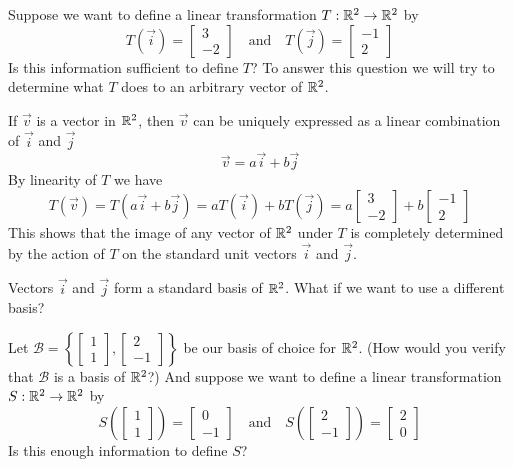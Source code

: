 \documentclass{ximera}
\begin{document}
\begin{exploration}\label{init:tij}  Suppose we want to define a linear transformation $T:\mathbb{R}^2\rightarrow \mathbb{R}^2$ by $$T(\vec{i})=\begin{bmatrix}3\\-2\end{bmatrix}\quad\text{and}\quad T(\vec{j})=\begin{bmatrix}-1\\2\end{bmatrix}$$  
Is this information sufficient to define $T$?  
To answer this question we will try to determine what $T$ does to an arbitrary vector of $\mathbb{R}^2$.  

If $\vec{v}$ is a vector in $\mathbb{R}^2$, then $\vec{v}$ can be uniquely expressed as a linear combination of $\vec{i}$ and $\vec{j}$
$$\vec{v}=a\vec{i}+b\vec{j}$$  By linearity of $T$ we have $$T(\vec{v})=T(a\vec{i}+b\vec{j})=aT(\vec{i})+bT(\vec{j})=a\begin{bmatrix}3\\-2\end{bmatrix}+b\begin{bmatrix}-1\\2\end{bmatrix}$$
This shows that the image of any vector of $\mathbb{R}^2$ under $T$ is completely determined by the action of $T$ on the standard unit vectors $\vec{i}$ and $\vec{j}$.  

Vectors $\vec{i}$ and $\vec{j}$ form a standard basis of $\mathbb{R}^2$.  What if we want to use a different basis?  

Let $\mathcal{B}=\left\{\begin{bmatrix}1\\1\end{bmatrix},\begin{bmatrix}2\\-1\end{bmatrix}\right\}$ be our basis of choice for $\mathbb{R}^2$. (How would you verify that $\mathcal{B}$ is a basis of $\mathbb{R}^2$?) And suppose we want to define a linear transformation $S:\mathbb{R}^2\rightarrow \mathbb{R}^2$ by $$S\left(\begin{bmatrix}1\\1\end{bmatrix}\right)=\begin{bmatrix}0\\-1\end{bmatrix}\quad\text{and}\quad S\left(\begin{bmatrix}2\\-1\end{bmatrix}\right)=\begin{bmatrix}2\\0\end{bmatrix}$$
Is this enough information to define $S$?


\end{exploration}
\end{document}
